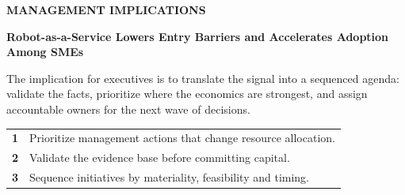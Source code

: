 \documentclass[10pt,a4paper]{article}
\begin{document}
\vspace{6pt}{\textcolor{BOBlue}{\scriptsize\bfseries STRATEGIC POSITIONING MAP}}\par
\begin{center}
\end{center}

\clearpage
{\textcolor{BOBlue}{\scriptsize\bfseries MANAGEMENT IMPLICATIONS}}\par\vspace{-1pt}
{\Large\sffamily\bfseries\color{BONavy} Robot-as-a-Service Lowers Entry Barriers and Accelerates Adoption Among SMEs}\par\vspace{4pt}
{\small The implication for executives is to translate the signal into a sequenced agenda: validate the facts, prioritize where the economics are strongest, and assign accountable owners for the next wave of decisions.}\par
\begin{tabularx}{\linewidth}{p{10mm}Y}
\textcolor{BOBlue}{\bfseries 1} & Prioritize management actions that change resource allocation. \\[5pt]
\textcolor{BOBlue}{\bfseries 2} & Validate the evidence base before committing capital. \\[5pt]
\textcolor{BOBlue}{\bfseries 3} & Sequence initiatives by materiality, feasibility and timing. \\[5pt]
\end{tabularx}
\vspace{6pt}
\end{document}
